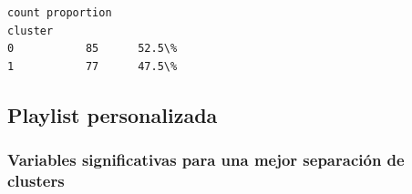 \documentclass[11pt]{article}
\makeatletter
\newcommand{\boxspacing}{\kern\kvtcb@left@rule\kern\kvtcb@boxsep}
\newcommand{\prompt}[4]{
        {\ttfamily\llap{{\color{#2}[#3]:\hspace{3pt}#4}}\vspace{-\baselineskip}}
    }
\makeatother
\begin{document}
            \begin{tcolorbox}[breakable, size=fbox, boxrule=.5pt, pad at break*=1mm, opacityfill=0]
\prompt{Out}{outcolor}{47}{\boxspacing}
\begin{Verbatim}[commandchars=\\\{\}]
         count proportion
cluster
0           85      52.5\%
1           77      47.5\%
\end{Verbatim}
\end{tcolorbox}
        
    \hypertarget{playlist-personalizada}{%
\subsection{Playlist personalizada}\label{playlist-personalizada}}

    \hypertarget{variables-significativas-para-una-mejor-separaciuxf3n-de-clusters}{%
\subsubsection{Variables significativas para una mejor separación de
clusters}\label{variables-significativas-para-una-mejor-separaciuxf3n-de-clusters}}
\end{document}
